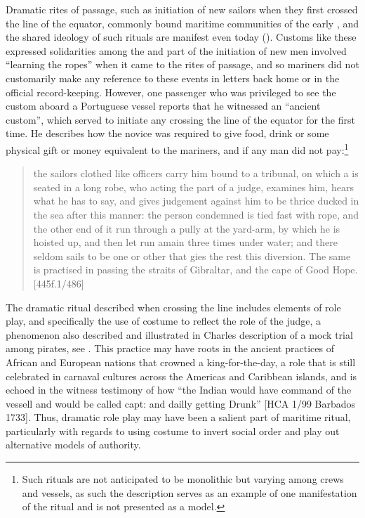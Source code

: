 Dramatic rites of passage, such as initiation of new sailors when they first crossed the line of the equator, commonly bound maritime communities of the early , and the shared ideology of such rituals are manifest even today (\citealt{Bronner2006}). Customs like these expressed solidarities among the  and part of the initiation of new men involved “learning the ropes” when it came to the rites of passage, and so mariners did not customarily make any reference to these events in letters back home or in the official record-keeping. However, one passenger who was privileged to see the custom aboard a  Portuguese vessel reports that he witnessed an “ancient custom”, which served to initiate any  crossing the line of the equator for the first time. He describes how the novice  was required to give food, drink or some physical gift or money equivalent to the mariners, and if any man did not pay:\footnote{Such rituals are not anticipated to be monolithic but varying among crews and vessels, as such the description serves as an example of one manifestation of the ritual and is not presented as a model.} 

\begin{quotation}
the sailors clothed like officers carry him bound to a tribunal, on which a  is seated in a long robe, who acting the part of a judge, examines him, hears what he has to say, and gives judgement against him to be thrice ducked in the sea after this manner: the person condemned is tied fast with rope, and the other end of it run through a pully at the yard-arm, by which he is hoisted up, and then let run amain three times under water; and there seldom sails to be one or other that gies the rest this diversion. The same is practised in passing the straits of Gibraltar, and the cape of Good Hope. [445f.1/486] 
\end{quotation}

The dramatic ritual described when crossing the line includes elements of role play, and specifically the use of costume to reflect the role of the judge, a phenomenon also described and illustrated in Charles  description of a mock trial among pirates, see . This practice may have roots in the ancient practices of African and European nations that crowned a king-for-the-day, a role that is still celebrated in carnaval cultures across the Americas and Caribbean islands, and is echoed in the witness testimony of how “the Indian would have command of the vessell and would be called capt: and dailly getting Drunk” [HCA 1/99 Barbados {1733}]. Thus, dramatic role play may have been a salient part of maritime ritual, particularly with regards to using costume to invert social order and play out alternative models of authority. 


